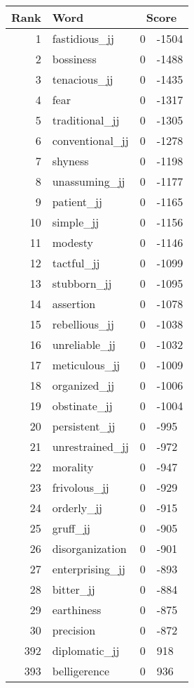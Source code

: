 \begin{longtable}[!htbp]{| rlr@{.}l |}
    \hline
    \textbf{Rank} & \textbf{Word} & \multicolumn{2}{c|}{\textbf{Score}} \\
    \hline
    \endhead
    1 & fastidious\_jj & 0 & -1504 \\
    2 & bossiness & 0 & -1488 \\
    3 & tenacious\_jj & 0 & -1435 \\
    4 & fear & 0 & -1317 \\
    5 & traditional\_jj & 0 & -1305 \\
    6 & conventional\_jj & 0 & -1278 \\
    7 & shyness & 0 & -1198 \\
    8 & unassuming\_jj & 0 & -1177 \\
    9 & patient\_jj & 0 & -1165 \\
    10 & simple\_jj & 0 & -1156 \\
    11 & modesty & 0 & -1146 \\
    12 & tactful\_jj & 0 & -1099 \\
    13 & stubborn\_jj & 0 & -1095 \\
    14 & assertion & 0 & -1078 \\
    15 & rebellious\_jj & 0 & -1038 \\
    16 & unreliable\_jj & 0 & -1032 \\
    17 & meticulous\_jj & 0 & -1009 \\
    18 & organized\_jj & 0 & -1006 \\
    19 & obstinate\_jj & 0 & -1004 \\
    20 & persistent\_jj & 0 & -995 \\
    21 & unrestrained\_jj & 0 & -972 \\
    22 & morality & 0 & -947 \\
    23 & frivolous\_jj & 0 & -929 \\
    24 & orderly\_jj & 0 & -915 \\
    25 & gruff\_jj & 0 & -905 \\
    26 & disorganization & 0 & -901 \\
    27 & enterprising\_jj & 0 & -893 \\
    28 & bitter\_jj & 0 & -884 \\
    29 & earthiness & 0 & -875 \\
    30 & precision & 0 & -872 \\
    392 & diplomatic\_jj & 0 & 918 \\
    393 & belligerence & 0 & 936 \\

\end{longtable}
